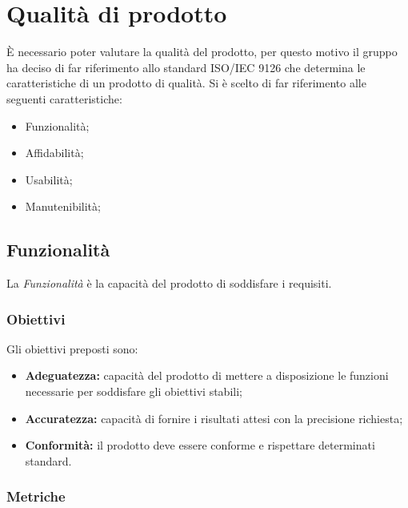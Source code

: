 \section{Qualità di prodotto}
È necessario poter valutare la qualità del prodotto, per questo motivo il gruppo \Omicron{} ha deciso di far riferimento allo standard ISO/IEC 9126 che determina le caratteristiche di un prodotto di qualità. Si è scelto di far riferimento alle seguenti caratteristiche:
\begin {itemize}
	\item{Funzionalità;}
	\item{Affidabilità;}
	\item{Usabilità;}
	\item{Manutenibilità;}
\end{itemize}

\subsection{Funzionalità}
La \textit{Funzionalità} è la capacità del prodotto di soddisfare i requisiti.
\subsubsection{Obiettivi}
Gli obiettivi preposti sono:
\begin {itemize}
	\item \textbf{Adeguatezza:} capacità del prodotto di mettere a disposizione le funzioni necessarie per soddisfare gli obiettivi stabili;
	\item \textbf{Accuratezza:} capacità di fornire i risultati attesi con la precisione richiesta;
	\item \textbf{Conformità:} il prodotto deve essere conforme e rispettare determinati standard.
\end{itemize}
\subsubsection{Metriche}
